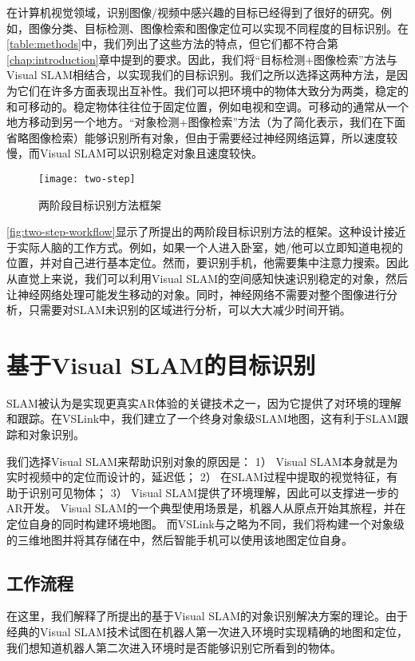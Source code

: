 在计算机视觉领域，识别图像/视频中感兴趣的目标已经得到了很好的研究。例如，图像分类\cite{he2019bag}、目标检测\cite{zou2019object}、图像检索\cite{philbin2008lost,zheng2017sift}和图像定位\cite{sattler2011fast}可以实现不同程度的目标识别。在\autoref{table:methods}中，我们列出了这些方法的特点，但它们都不符合第\ref{chap:introduction}章中提到的要求。因此，我们将“目标检测+图像检索”方法与Visual SLAM相结合，以实现我们的目标识别。我们之所以选择这两种方法，是因为它们在许多方面表现出互补性。我们可以把环境中的物体大致分为两类，稳定的和可移动的。稳定物体往往位于固定位置，例如电视和空调。可移动的通常从一个地方移动到另一个地方。“对象检测+图像检索”方法（为了简化表示，我们在下面省略图像检索）能够识别所有对象，但由于需要经过神经网络运算，所以速度较慢，而Visual SLAM可以识别稳定对象且速度较快。

\begin{figure}[htbp]
  \centering
  \texttt{[image: two-step]}
  \caption{两阶段目标识别方法框架}
  \label{fig:two-step-workflow}
\end{figure}

\autoref{fig:two-step-workflow}显示了所提出的两阶段目标识别方法的框架。这种设计接近于实际人脑的工作方式。例如，如果一个人进入卧室，她/他可以立即知道电视的位置，并对自己进行基本定位。然而，要识别手机，他需要集中注意力搜索。因此从直觉上来说，我们可以利用Visual SLAM的空间感知快速识别稳定的对象，然后让神经网络处理可能发生移动的对象。同时，神经网络不需要对整个图像进行分析，只需要对SLAM未识别的区域进行分析，可以大大减少时间开销。




   
\section{基于Visual SLAM的目标识别}
\label{sec:vslam}
SLAM被认为是实现更真实AR体验的关键技术之一，因为它提供了对环境的理解和跟踪。在VSLink中，我们建立了一个终身对象级SLAM地图，这有利于SLAM跟踪和对象识别。

我们选择Visual SLAM来帮助识别对象的原因是：
1） Visual SLAM本身就是为实时视频中的定位而设计的，延迟低；
2） 在SLAM过程中提取的视觉特征，有助于识别可见物体；
3） Visual SLAM提供了环境理解，因此可以支撑进一步的AR开发。
Visual SLAM的一个典型使用场景是，机器人从原点开始其旅程，并在定位自身的同时构建环境地图。
而VSLink与之略为不同，我们将构建一个对象级的三维地图并将其存储在{\edg}中，然后智能手机可以使用该地图定位自身。

\subsection{工作流程}
在这里，我们解释了所提出的基于Visual SLAM的对象识别解决方案的理论。由于经典的Visual SLAM\cite{mur2017orb,engel2014lsd}技术试图在机器人第一次进入环境时实现精确的地图和定位，我们想知道机器人第二次进入环境时是否能够识别它所看到的物体。

